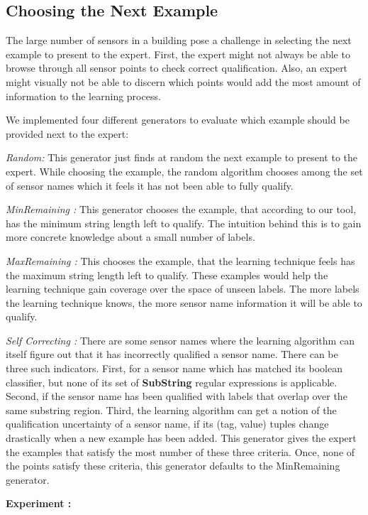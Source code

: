 \subsection{Choosing the Next Example}


The large number of sensors in a building pose a challenge in selecting the next example to present to the expert. First, the expert might not always be able to browse through all sensor points to check correct qualification. Also, an expert might visually not be able to discern which points would add the most amount of information to the learning process. 

We implemented four different generators to evaluate which example should be provided next to the expert:

{\it Random:} This generator just finds at random the next example to present to the expert. While choosing the example, the random algorithm chooses among the set of sensor names which it feels it has not been able to fully qualify.  

{\it MinRemaining :} This generator chooses the example, that according to our tool, has the minimum string length left to qualify. The intuition behind this is to gain more concrete knowledge about a small number of labels.

{\it MaxRemaining :} This chooses the example, that the learning technique feels has the maximum string length left to qualify. These examples would help the learning technique gain coverage over the space of unseen labels. The more labels the learning technique knows, the more sensor name information it will be able to qualify.

{\it Self Correcting :} There are some sensor names where the learning algorithm can itself figure out that it has incorrectly qualified a sensor name. There can be three such indicators. First, for a sensor name which has matched its boolean classifier, but none of its set of {\bf SubString} regular expressions is applicable. Second, if the sensor name has been qualified with labels that overlap over the same substring region. Third, the learning algorithm can get a notion of the qualification uncertainty of a sensor name, if its (tag, value) tuples change drastically when a new example has been added. This generator gives the expert the examples that satisfy the most number of these three criteria. Once, none of the points satisfy these criteria, this generator defaults to the MinRemaining generator.

{\bf Experiment :}

